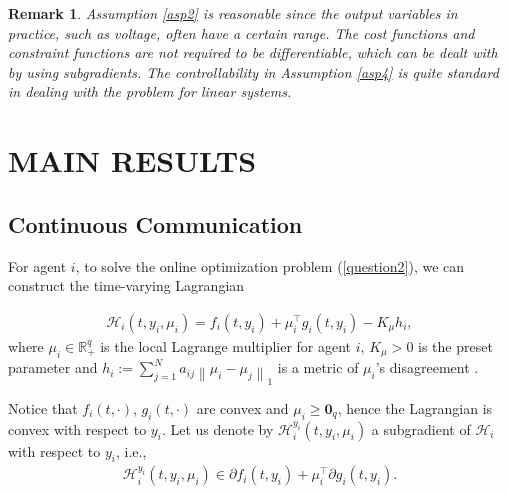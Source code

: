 \documentclass[letterpaper, 10 pt, conference]{ieeeconf}  %
\newtheorem{remark}{ {Remark}}
\begin{document}
\begin{remark}
	Assumption \ref{asp2} is reasonable since the output variables in practice, such as voltage, often have a certain range. The cost functions and constraint functions are not required to be differentiable, which can be dealt with by using subgradients. The controllability in Assumption \ref{asp4} is quite standard in dealing with the problem for linear systems.
\end{remark}




\section{MAIN RESULTS}\label{mai}

\subsection{Continuous Communication}



For agent $i$, to solve the online optimization problem (\ref{question2}), we can construct the time-varying Lagrangian

\begin{align}
	\mathcal{H}_i(t,y_i,\mu_i)=f_i(t,y_i)+\mu_i^\top g_i(t,y_i) - K_\mu h_i,\label{la}
\end{align}
where $\mu_i\in\mathbb{R}_+^{q}$ is the local Lagrange multiplier for agent $i$, $K_\mu>0$ is the preset parameter and $h_i:= \sum_{j=1}^N a_{ij}\left\|\mu_i-\mu_j\right\|_1$ is a metric of $\mu_i$'s disagreement \cite{liang2018}. 


Notice that $f_i(t,\cdot)$, $g_i(t,\cdot)$ are convex and $\mu_i \ge \boldsymbol 0_q$,
hence the Lagrangian is convex with respect to $y_i$. Let us
denote by $\mathcal{H}_i^{y_i}(t,y_i,\mu_i)$ a subgradient of $\mathcal{H}_i$ with respect to $y_i$, i.e.,
\begin{align}
	\mathcal{H}_i^{y_i}(t,y_i,\mu_i)\in \partial f_i(t,y_i)+\mu_i^\top \partial g_i(t,y_i).\label{lax}
\end{align}
\end{document}
